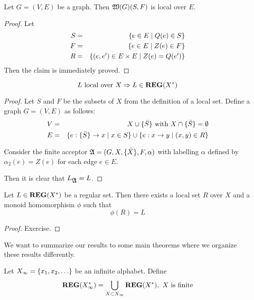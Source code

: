 \bigskip
\begin{lemma}
Let $G = (V, E)$ be a graph. Then $\mbox{$\mathfrak{W}({G})$}(S, F)$ is local over $E$.
\end{lemma}

\begin{proof}
Let \begin{eqnarray*}
S & = & \mbox{$\{e \in E \mid Q(e) \in S\}$} \\ 
F & = & \mbox{$\{e \in E \mid Z(e) \in F\}$} \\
R & = & \mbox{$\{(e, e') \in E \times E \mid Z(e) = Q(e')\}$} 
\end{eqnarray*}
Then the claim is immediately proved.
\end{proof}

\bigskip
\begin{lemma}
\[ L \mbox{ local over } X \Rightarrow L \in \mbox{{\bf REG}}(X^*) \]
\end{lemma}

\begin{proof}
Let $S$ and $F$ be the subsets of $X$ from the definition of a local
set. Define a graph $G = (V, E)$ as follows:
\begin{eqnarray*}
V & = & X \cup \mbox{$\{\bar{S}\}$} \mbox{ with } X \cap \mbox{$\{\bar{S}\}$} = \emptyset
\\
E & = & \mbox{$\{e : \mbox{$\{\bar{S}\}$} \to x \mid x \in S\}$} \cup \mbox{$\{e : x \to y
\mid (x, y) \in R\}$}
\end{eqnarray*}

Consider the finite acceptor $\mbox{$\mathfrak{A}$} = (G, X, \mbox{$\{\bar{X}\}$}, F, \alpha)$ with
labelling $\alpha$ defined by $\alpha_2(e) = Z(e)$ for each edge $e \in E$.

Then it is clear that $L_{\mbox{$\mathfrak{A}$}} = L$.
\end{proof}

\bigskip
\begin{lemma}
Let $L \in \mbox{{\bf REG}}(X^*)$ be a regular set. Then there exists a local set
$R$ over $X$ and a monoid homomorphism $\phi$ such that \[ \phi(R) = L \]
\end{lemma}

\begin{proof}
Exercise.
\end{proof}

\bigskip
We want to summarize our results to some main theorems where we organize these
results differently.

Let $X_\infty = \mbox{$\{x_1, x_2, \ldots\}$}$ be an infinite alphabet. Define 
\[ \mbox{{\bf REG}}(X_\infty^*) = \bigcup_{X \subset X_\infty} \mbox{{\bf REG}}(X^*),\ X
	\text{ is finite} \]

